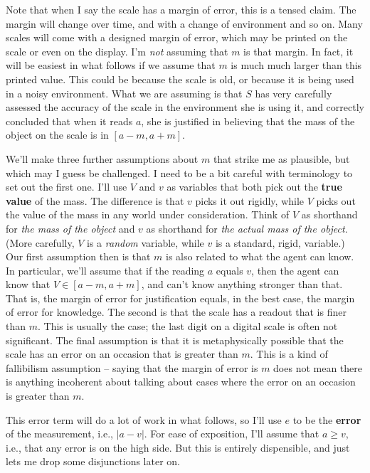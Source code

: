 Note that when I say the scale has a margin of error, this is a tensed claim. The margin will change over time, and with a change of environment and so on. Many scales will come with a designed margin of error, which may be printed on the scale or even on the display. I'm \textit{not} assuming that $m$ is that margin. In fact, it will be easiest in what follows if we assume that $m$ is much much larger than this printed value. This could be because the scale is old, or because it is being used in a noisy environment. What we are assuming is that $S$ has very carefully assessed the accuracy of the scale in the environment she is using it, and correctly concluded that when it reads $a$, she is justified in believing that the mass of the object on the scale is in $[a -m, a+m]$.

We'll make three further assumptions about $m$ that strike me as plausible, but which may I guess be challenged. I need to be a bit careful with terminology to set out the first one. I'll use $V$ and $v$ as variables that both pick out the \textbf{true value} of the mass. The difference is that $v$ picks it out rigidly, while $V$ picks out the value of the mass in any world under consideration. Think of $V$ as shorthand for \textit{the mass of the object} and $v$ as shorthand for \textit{the actual mass of the object}. (More carefully, $V$ is a \textit{random} variable, while $v$ is a standard, rigid, variable.) Our first assumption then is that $m$ is also related to what the agent can know. In particular, we'll assume that if the reading $a$ equals $v$, then the agent can know that $V \in [a-m, a+m]$, and can't know anything stronger than that. That is, the margin of error for justification equals, in the best case, the margin of error for knowledge. The second is that the scale has a readout that is finer than $m$. This is usually the case; the last digit on a digital scale is often not significant. The final assumption is that it is metaphysically possible that the scale has an error on an occasion that is greater than $m$. This is a kind of fallibilism assumption -- saying that the margin of error is $m$ does not mean there is anything incoherent about talking about cases where the error on an occasion is greater than $m$.

This error term will do a lot of work in what follows, so I'll  use $e$ to be the \textbf{error} of the measurement, i.e., $|a-v|$. For ease of exposition, I'll assume that $a \geq v$, i.e., that any error is on the high side. But this is entirely dispensible, and just lets me drop some disjunctions later on.

